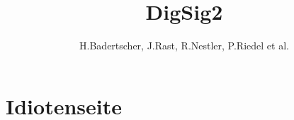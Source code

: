 \documentclass{scrartcl}
\title{DigSig2}
\author{H.Badertscher, J.Rast, R.Nestler, P.Riedel et al.}
\begin{document}
\setcounter{tocdepth}{2}

\maketitle
\newpage

\tableofcontents
\newpage


\begin{multicols}{2}

\newpage

\end{multicols}





\appendix
\section{Idiotenseite}



\begin{multicols}{2}






\end{multicols}

\end{document}
